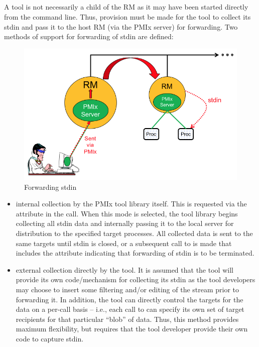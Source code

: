 \subsection{}

A tool is not necessarily a child of the \ac{RM} as it may have been started directly from the command line. Thus, provision must be made for the tool to collect its stdin and pass it to the host \ac{RM} (via the \ac{PMIx} server) for forwarding. Two methods of support for forwarding of stdin are defined:

\begin{figure}
  \begin{center}
    \includegraphics[clip,width=0.98\linewidth]{figs/input.png}
  \end{center}
    \caption{Forwarding stdin}
    \label{fig:stdin}
\end{figure}

\begin{itemize}
    \item internal collection by the \ac{PMIx} tool library itself. This is requested via the  attribute in the  call. When this mode is selected, the tool library begins collecting all stdin data and internally passing it to the local server for distribution to the specified target processes. All collected data is sent to the same targets until stdin is closed, or a subsequent call to  is made that includes the  attribute indicating that forwarding of stdin is to be terminated.
    \item external collection directly by the tool. It is assumed that the tool will provide its own code/mechanism for collecting its stdin as the tool developers may choose to insert some filtering and/or editing of the stream prior to forwarding it. In addition, the tool can directly control the targets for the data on a per-call basis – i.e., each call to  can specify its own set of target recipients for that particular ``blob'' of data. Thus, this method provides maximum flexibility, but requires that the tool developer provide their own code to capture stdin.
\end{itemize}

